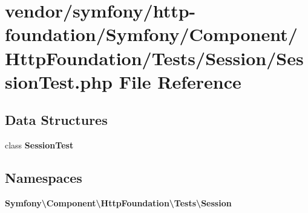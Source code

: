\section{vendor/symfony/http-\/foundation/\+Symfony/\+Component/\+Http\+Foundation/\+Tests/\+Session/\+Session\+Test.php File Reference}
\label{_session_test_8php}
\subsection*{Data Structures}
\begin{DoxyCompactItemize}
\item 
class {\bf Session\+Test}
\end{DoxyCompactItemize}
\subsection*{Namespaces}
\begin{DoxyCompactItemize}
\item 
 {\bf Symfony\textbackslash{}\+Component\textbackslash{}\+Http\+Foundation\textbackslash{}\+Tests\textbackslash{}\+Session}
\end{DoxyCompactItemize}
